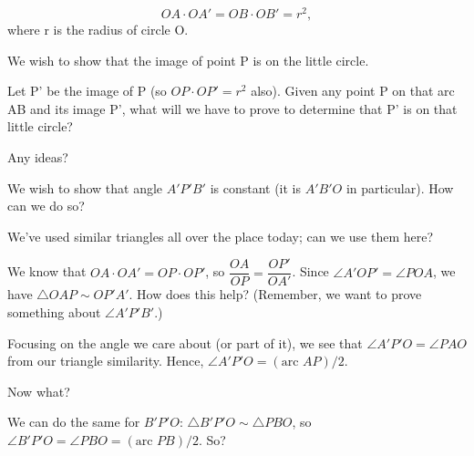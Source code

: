 $$  OA \cdot OA' = OB \cdot OB' = r^2, $$
where r is the radius of circle O.

We wish to show that the image of point P is on the little circle.

Let P' be the image of P (so $OP \cdot OP' = r^2$ also).  Given any point P on that arc AB and its image P', what will we have to prove to determine that P' is on that little circle?

Any ideas?


We wish to show that angle $A'P'B'$ is constant (it is $A'B'O$ in particular).  How can we do so?

We've used similar triangles all over the place today; can we use them here?

We know that $OA \cdot OA' = OP \cdot OP'$, so $\dfrac{OA}{OP} = \dfrac{OP'}{OA'}$.  Since $\angle A'OP' = \angle POA$, we have $\triangle OAP \sim OP'A'$.  How does this help?  (Remember, we want to prove something about $\angle A'P'B'$.)


Focusing on the angle we care about (or part of it), we see that $\angle A'P'O = \angle PAO$ from our triangle similarity.  Hence, $\angle A'P'O = (\text{arc }AP)/2$.

Now what?


We can do the same for $B'P'O$: $\triangle B'P'O \sim \triangle PBO$, so $\angle B'P'O = \angle PBO = (\text{arc } PB)/2$.  So?




